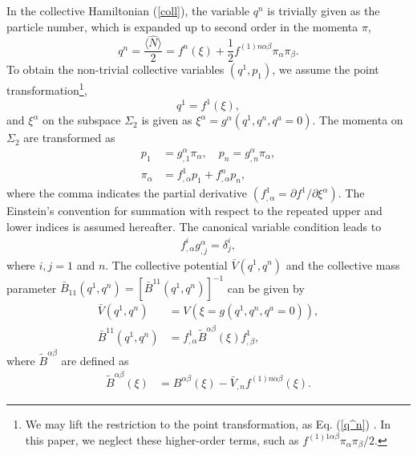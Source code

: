 \documentclass[11pt]{book} %
\begin{document}
In the collective Hamiltonian (\ref{coll}), the variable $q^n$ is
trivially given as the particle number, which is expanded up to
second order in the momenta $\pi$,
\begin{equation}
q^n=\frac{\langle \hat{N} \rangle}{2} = f^n(\xi)
	+\frac{1}{2}f^{(1)n\alpha\beta}\pi_\alpha\pi_\beta .
	\label{q^n}
\end{equation}
To obtain the non-trivial collective variables
$(q^1,p_1)$, we assume the point transformation\footnote{
We may lift the restriction to the point transformation,
as Eq. (\ref{q^n}) \cite{Sat18}.
In this paper, we neglect these higher-order terms, such as
$f^{(1)1\alpha\beta}\pi_\alpha\pi_\beta/2$.
},
\begin{equation}
  q^1 = f^1(\xi) \label{point} ,
\end{equation}
and $\xi^\alpha$ on the subspace $\Sigma_2$ is given as
$\xi^{\alpha} = g^{\alpha}(q^1,q^n,q^a=0)$.
The momenta on $\Sigma_2$ are transformed as
\begin{align}
p_1 &= g_{,1}^{\alpha}\pi_{\alpha} , \quad p_n = g_{,n}^\alpha \pi_\alpha,
	\label{coll_momenta}\\
\pi_{\alpha} &= f^1_{,\alpha}p_1 +f^n_{,\alpha}p_n,
 \label{momenta}
\end{align}
where the comma indicates the partial derivative
$(f^1_{,\alpha}=\partial f^1/\partial \xi^{\alpha})$. 
The Einstein's convention for summation with respect to the repeated
upper and lower indices is assumed hereafter.
The canonical variable condition leads to
\begin{align}
f^i_{,\alpha}g_{,j}^{\alpha} = \delta^i_j,
  \label{canonicity}
\end{align}
where $i,j=1$ and $n$.
The collective potential $\bar{V}(q^1,q^n)$ and
the collective mass parameter
$\bar{B}_{11}(q^1,q^n)=[\bar{B}^{11}(q^1,q^n)]^{-1}$ can be given by
\begin{align}
\bar{V}(q^1,q^n) &= V(\xi=g(q^1,q^n,q^a=0)), \\
\bar{B}^{11}(q^1,q^n) &= f^1_{,\alpha}\tilde{B}^{\alpha\beta}(\xi)f^1_{,\beta} ,
  \label{coll_mass}
\end{align}
where $\tilde{B}^{\alpha\beta}$ are defined as
\begin{align}
 \tilde{B}^{\alpha\beta}(\xi)
&= B^{\alpha\beta}(\xi) - \bar{V}_{,n} f^{(1)n\alpha\beta}(\xi)
\label{tildeB}.
\end{align} 
\end{document}
